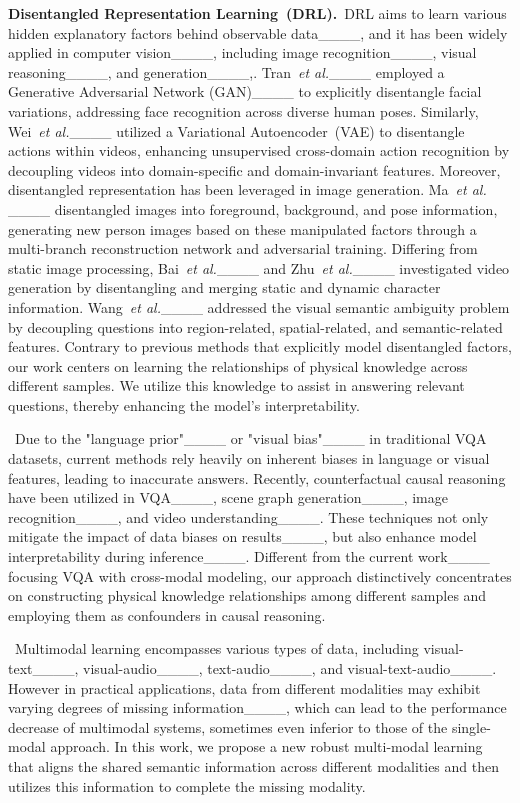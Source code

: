 \noindent
{\bf Disentangled Representation Learning~(DRL).}~DRL aims to learn various hidden explanatory factors behind observable data____, and it has been widely applied in computer vision____, including image recognition____, visual reasoning____, and generation____,. Tran~{\it et al.}____ employed a Generative Adversarial Network (GAN)____ to explicitly disentangle facial variations, addressing face recognition across diverse human poses.  Similarly, Wei~{\it et al.}____ utilized a Variational Autoencoder~(VAE) to disentangle actions within videos, enhancing unsupervised cross-domain action recognition by decoupling videos into domain-specific and domain-invariant features. Moreover, disentangled representation has been leveraged in image generation. Ma~{\it et al.} ____ disentangled images into foreground, background, and pose information, generating new person images based on these manipulated factors through a multi-branch reconstruction network and adversarial training. Differing from static image processing, Bai~{\it et al.}____ and Zhu~{\it et al.}____ investigated video generation by disentangling and merging static and dynamic character information. Wang~{\it et al.}____ addressed the visual semantic ambiguity problem by decoupling questions into region-related, spatial-related, and semantic-related features. Contrary to previous methods that explicitly model disentangled factors, our work centers on learning the relationships of physical knowledge across different samples. We utilize this knowledge to assist in answering relevant questions, thereby enhancing the model's interpretability.


~Due to the "language prior"____ or "visual  bias"____ in traditional VQA datasets, current methods rely heavily on inherent biases in language or visual features, leading to inaccurate answers. Recently, counterfactual causal reasoning have been utilized in VQA____, scene graph generation____, image recognition____, and video understanding____.  These techniques not only mitigate the impact of data biases on results____, but also enhance model interpretability during inference____. Different from the current work____ focusing VQA with cross-modal modeling, our approach distinctively concentrates on constructing physical knowledge relationships among different samples and employing them as confounders in causal reasoning.

~Multimodal learning encompasses various types of data, including visual-text____, visual-audio____, text-audio____, and visual-text-audio____. However in practical applications, data from different modalities may exhibit varying degrees of missing information____, which can lead to the performance decrease of multimodal systems, sometimes even inferior to those of the single-modal approach. In this work, we propose a new robust multi-modal learning that aligns the shared semantic information across different modalities and then utilizes this information to complete the missing modality.



